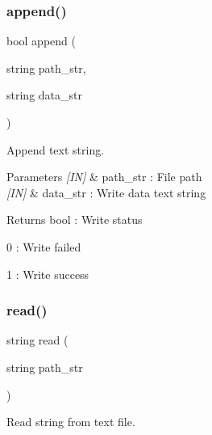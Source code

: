 \subsubsection{append()\hspace{0.1cm}{\footnotesize\ttfamily [2/2]}}
{\footnotesize\ttfamily bool append (\begin{DoxyParamCaption}\item[{string}]{path\+\_\+str,  }\item[{string}]{data\+\_\+str }\end{DoxyParamCaption})}



Append text string. 


\begin{DoxyCode}{0}
\end{DoxyCode}



\begin{DoxyParams}{Parameters}
{\em \mbox{[}\+I\+N\mbox{]}} & path\+\_\+str \+: File path \\
\hline
{\em \mbox{[}\+I\+N\mbox{]}} & data\+\_\+str \+: Write data text string \\
\hline
\end{DoxyParams}
\begin{DoxyReturn}{Returns}
bool \+: Write status \begin{DoxyItemize}
\item 0 \+: Write failed \item 1 \+: Write success \end{DoxyItemize}

\end{DoxyReturn}
\mbox{\label{classfile_aa7cd42652ec367d983a3de4892df6617}} 
\subsubsection{read()}
{\footnotesize\ttfamily string read (\begin{DoxyParamCaption}\item[{string}]{path\+\_\+str }\end{DoxyParamCaption})}



Read string from text file. 


\begin{DoxyCode}{0}
\end{DoxyCode}



